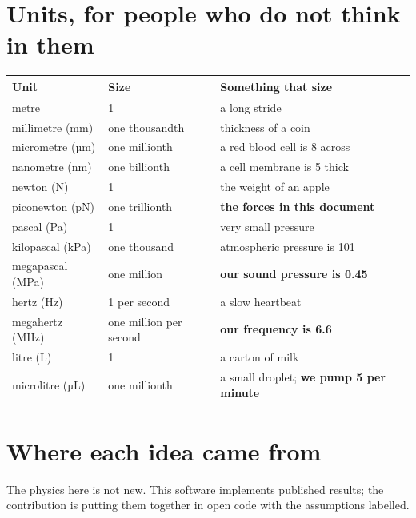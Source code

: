 \documentclass[11pt,a4paper]{article}
\begin{document}
\section{Units, for people who do not think in them}

\begin{center}\small
\begin{tabular}{lll}
\toprule
\textbf{Unit} & \textbf{Size} & \textbf{Something that size} \\
\midrule
metre & 1 & a long stride \\
millimetre (mm) & one thousandth & thickness of a coin \\
micrometre (µm) & one millionth & a red blood cell is 8 across \\
nanometre (nm) & one billionth & a cell membrane is 5 thick \\
\midrule
newton (N) & 1 & the weight of an apple \\
piconewton (pN) & one trillionth & \textbf{the forces in this document} \\
\midrule
pascal (Pa) & 1 & very small pressure \\
kilopascal (kPa) & one thousand & atmospheric pressure is 101 \\
megapascal (MPa) & one million & \textbf{our sound pressure is 0.45} \\
\midrule
hertz (Hz) & 1 per second & a slow heartbeat \\
megahertz (MHz) & one million per second & \textbf{our frequency is 6.6} \\
\midrule
litre (L) & 1 & a carton of milk \\
microlitre (µL) & one millionth & a small droplet; \textbf{we pump 5 per minute} \\
\bottomrule
\end{tabular}
\end{center}

\section{Where each idea came from}

The physics here is not new. This software implements published results; the
contribution is putting them together in open code with the assumptions labelled.
\end{document}
